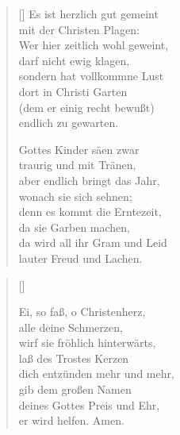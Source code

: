 \begin{multicols}{2}
\begin{verse}[\versewidth]
 Es ist herzlich gut gemeint\\
mit der Christen Plagen:\\
Wer hier zeitlich wohl geweint,\\
darf nicht ewig klagen,\\
sondern hat vollkommne Lust\\
dort in Christi Garten\\
(dem er einig recht bewußt)\\
endlich zu gewarten.

 Gottes Kinder säen zwar\\
traurig und mit Tränen,\\
aber endlich bringt das Jahr,\\
wonach sie sich sehnen;\\
denn es kommt die Erntezeit,\\
da sie Garben machen,\\
da wird all ihr Gram und Leid\\
lauter Freud und Lachen.

\end{verse}
\end{multicols}

\begin{center}
\settowidth{\versewidth}{Der, vor dem die Welt erschrickt,}
\begin{verse}[\versewidth]



 Ei, so faß, o Christenherz,\\
alle deine Schmerzen,\\
wirf sie fröhlich hinterwärts,\\
laß des Trostes Kerzen\\
dich entzünden mehr und mehr,\\
gib dem großen Namen\\
deines Gottes Preis und Ehr,\\
er wird helfen. Amen.
   
  
\end{verse}
\end{center}



